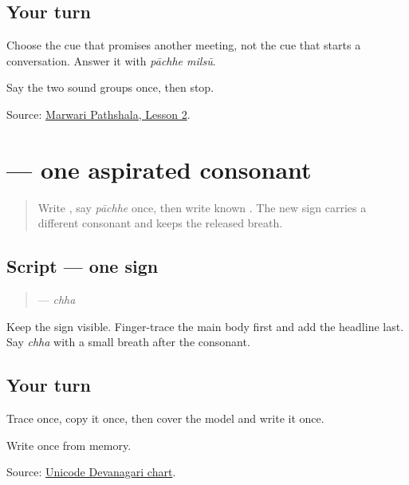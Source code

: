 \subsection*{Your turn}
Choose the cue that promises another meeting, not the cue that starts a conversation. Answer it with \emph{pāchhe milsū}.

\begin{tcolorbox}[breakable,colback=teal!4,colframe=teal!35!black,title={Before you move on}]
Say the two sound groups once, then stop.

Source: \href{https://www.marwaripathshala.com/marwari-lesson-2-english}{Marwari Pathshala, Lesson 2}.
\end{tcolorbox}
\section[\texorpdfstring{\mw{छ} (chha)}{छ (chha)}]{ — one aspirated consonant}

\label{lesson:MW-W07-chha}



\begin{quote}
Write \textbf{}, say \emph{pāchhe} once, then write known \textbf{}. The new sign carries a different consonant and keeps the released breath.
\end{quote}

\subsection*{Script — one sign}

\begin{quote}
\textbf{} — \emph{chha}
\end{quote}

Keep the sign visible. Finger-trace the main body first and add the headline last. Say \emph{chha} with a small breath after the consonant.

\subsection*{Your turn}
Trace \textbf{} once, copy it once, then cover the model and write it once.

\begin{tcolorbox}[breakable,colback=teal!4,colframe=teal!35!black,title={Before you move on}]
Write \textbf{} once from memory.

Source: \href{https://www.unicode.org/charts/PDF/U0900.pdf}{Unicode Devanagari chart}.
\end{tcolorbox}
